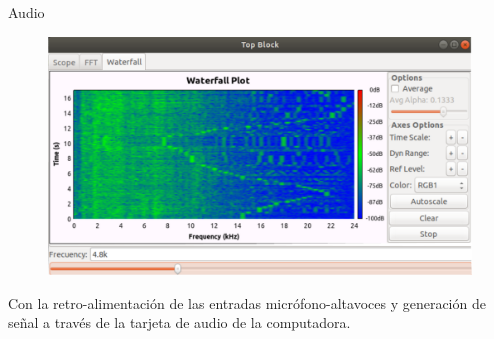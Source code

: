 \begin{frame}{Audio}

\begin{figure}
\begin{center}
\vspace{-8mm}
\includegraphics[width=\textwidth, height=0.6\paperheight]{parte1/lab3/pdf/lab3_10.pdf}
\end{center}
\end{figure}
\vspace{-5mm}
\tiny
Con la retro-alimentación de las entradas micrófono-altavoces y generación de señal a través de la tarjeta de audio de la computadora.

\end{frame}
